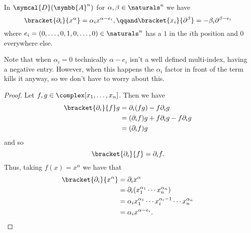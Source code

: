 \documentclass[fleqn]{NotesClass}
\newcommand{\D}{\symcal{D}}
\newcommand{\affine}{\symbb{A}}
\begin{document}
    \begin{lma}{}{}
        In \(\D(\affine^n)\) for \(\alpha, \beta \in \naturals^n\) we have
        \begin{equation}
            \bracket{\partial_i}{x^\alpha} = \alpha_i x^{\alpha - e_i}, \qqand \bracket{x_i}{\partial^\beta} = -\beta_i \partial^{\beta - e_i}
        \end{equation}
        where \(e_i = (0, \dotsc, 0, 1, 0, \dotsc, 0) \in \naturals^n\) has a \(1\) in the \(i\)th position and \(0\) everywhere else.
        \begin{rmk}
            Note that when \(\alpha_i = 0\) technically \(\alpha - e_i\) isn't a well defined multi-index, having a negative entry.
            However, when this happens the \(\alpha_i\) factor in front of the term kills it anyway, so we don't have to worry about this.
        \end{rmk}
        \begin{proof}
            Let \(f, g \in \complex[x_1, \dotsc, x_n]\).
            Then we have
            \begin{align}
                \bracket{\partial_i}{f}g &= \partial_i(fg) - f\partial_ig\\
                &= (\partial_if)g + f\partial_ig - f\partial_ig\\
                &= (\partial_if)g
            \end{align}
            and so
            \begin{equation}
                \bracket{\partial_i}{f} = \partial_i f.
            \end{equation}
            Thus, taking \(f(x) = x^\alpha\) we have that
            \begin{align}
                \bracket{\partial_i}{x^\alpha} &= \partial_i x^\alpha\\
                &= \partial_i(x_1^{\alpha_1} \dotsm x_n^{\alpha_n})\\
                &= \alpha_i x_1^{\alpha_1} \dotsm x_i^{\alpha_i - 1} \dotsm x_n^{\alpha_n}\\
                &= \alpha_i x^{\alpha - e_i}.
            \end{align}
            

\end{proof}
\end{lma}
\end{document}
